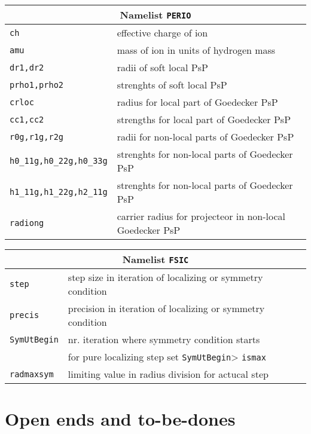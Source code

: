 \documentclass[12pt]{article}
\begin{document}
\begin{tabular}{ll}
\hline
\multicolumn{2}{c}{Namelist {\tt PERIO}} in {\tt for005.<name>} \\
\hline
{\tt ch}& effective charge of ion \\
{\tt amu}& mass of ion in units of hydrogen mass\\
{\tt dr1,dr2}& radii of soft local PsP\\
{\tt prho1,prho2}& strenghts of soft local PsP\\
{\tt crloc}& radius for local part of Goedecker PsP\\
{\tt cc1,cc2}& strengths for local part of  Goedecker PsP\\
{\tt r0g,r1g,r2g}& radii for non-local parts of  Goedecker PsP\\
{\tt h0\_11g,h0\_22g,h0\_33g}& 
  strenghts for non-local parts of  Goedecker PsP\\
{\tt h1\_11g,h1\_22g,h2\_11g}&
  strenghts for non-local parts of  Goedecker PsP\\
{\tt radiong}& carrier radius for projecteor in non-local Goedecker PsP\\
\hline
\end{tabular}


\begin{tabular}{ll}
\hline
\multicolumn{2}{c}{Namelist {\tt FSIC}} in {\tt for005.<name>} \\
\hline
{\tt step}& step size in iteration of localizing or symmetry condition \\
{\tt precis}& precision in iteration of localizing or symmetry condition \\
{\tt SymUtBegin}& nr. iteration where symmetry condition starts\\
 &               for pure localizing step set {\tt  SymUtBegin}> {\tt ismax}\\
{\tt radmaxsym}& limiting value in radius division  for actucal step\\
\hline
\end{tabular}

\newpage

\appendix
\section{Open ends and to-be-dones}
\end{document}
